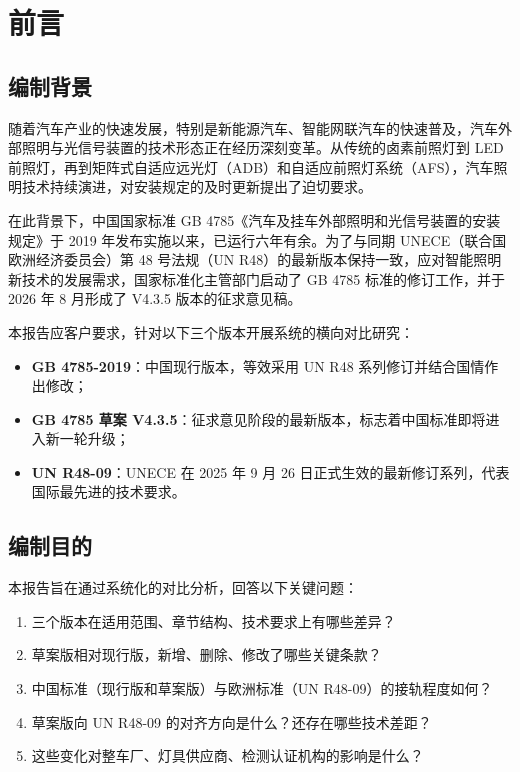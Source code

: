 
\chapter*{前言}

\section*{编制背景}

随着汽车产业的快速发展，特别是新能源汽车、智能网联汽车的快速普及，汽车外部照明与光信号装置的技术形态正在经历深刻变革。从传统的卤素前照灯到 LED 前照灯，再到矩阵式自适应远光灯（ADB）和自适应前照灯系统（AFS），汽车照明技术持续演进，对安装规定的及时更新提出了迫切要求。

在此背景下，中国国家标准 GB 4785《汽车及挂车外部照明和光信号装置的安装规定》于 2019 年发布实施以来，已运行六年有余。为了与同期 UNECE（联合国欧洲经济委员会）第 48 号法规（UN R48）的最新版本保持一致，应对智能照明新技术的发展需求，国家标准化主管部门启动了 GB 4785 标准的修订工作，并于 2026 年 8 月形成了 V4.3.5 版本的征求意见稿。

本报告应客户要求，针对以下三个版本开展系统的横向对比研究：

\begin{itemize}[leftmargin=2em]
    \item \textbf{GB 4785-2019}：中国现行版本，等效采用 UN R48 系列修订并结合国情作出修改；
    \item \textbf{GB 4785 草案 V4.3.5}：征求意见阶段的最新版本，标志着中国标准即将进入新一轮升级；
    \item \textbf{UN R48-09}：UNECE 在 2025 年 9 月 26 日正式生效的最新修订系列，代表国际最先进的技术要求。
\end{itemize}

\section*{编制目的}

本报告旨在通过系统化的对比分析，回答以下关键问题：

\begin{enumerate}[leftmargin=2em]
    \item 三个版本在适用范围、章节结构、技术要求上有哪些差异？
    \item 草案版相对现行版，新增、删除、修改了哪些关键条款？
    \item 中国标准（现行版和草案版）与欧洲标准（UN R48-09）的接轨程度如何？
    \item 草案版向 UN R48-09 的对齐方向是什么？还存在哪些技术差距？
    \item 这些变化对整车厂、灯具供应商、检测认证机构的影响是什么？
\end{enumerate}


